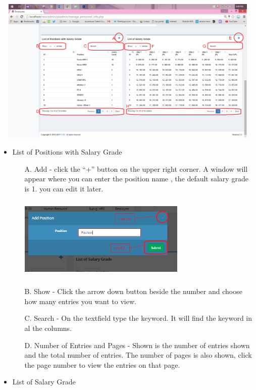 \begin{center}
	\includegraphics[width=15cm,height=7cm]{image/PISadmin2.png}
\end{center}
\begin{itemize}
	\item List of Positions with Salary Grade 
	\begin{enumerate}
		\item[A.] Add - click the “+” button on the upper right corner. A window will appear where you can enter the position name , the default salary grade is 1. you can edit it later.\\
		\begin{center}
			\includegraphics[width=8cm,height=4cm]{image/addpos_um.png}
		\end{center} 
		\item[B.] Show - Click the arrow down button beside the number and choose how many entries you want to view.
		\item[C.] Search - On the textfield type the keyword. It will find the keyword in al the columns.
		\item[D.] Number of Entries and Pages - Shown is the number of entries shown and the total number of entries. The number of pages is also shown, click the page number to view the entries on that page.
	\end{enumerate}
	\item List of Salary Grade
	\begin{enumerate}

\end{enumerate}
\end{itemize}
